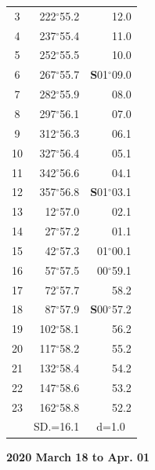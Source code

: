 \documentclass[10pt, a4paper]{report}
\begin{document}
\begin{scriptsize}
\begin{tabular*}{0.2\textwidth}[t]{@{\extracolsep{\fill}}|c|rr|}
3 & 222$^\circ$55.2 & \raisebox{0.24ex}{\boldmath$\cdot$~\boldmath$\cdot$~~}12.0\\
4 & 237$^\circ$55.4 & 11.0\\
5 & 252$^\circ$55.5 & 10.0\\[2Pt]
6 & 267$^\circ$55.7 & \textbf{S}01$^\circ$09.0\\
7 & 282$^\circ$55.9 & 08.0\\
8 & 297$^\circ$56.1 & 07.0\\
9 & 312$^\circ$56.3 & \raisebox{0.24ex}{\boldmath$\cdot$~\boldmath$\cdot$~~}06.1\\
10 & 327$^\circ$56.4 & 05.1\\
11 & 342$^\circ$56.6 & 04.1\\[2Pt]
12 & 357$^\circ$56.8 & \textbf{S}01$^\circ$03.1\\
13 & 12$^\circ$57.0 & 02.1\\
14 & 27$^\circ$57.2 & 01.1\\
15 & 42$^\circ$57.3 & 01$^\circ$00.1\\
16 & 57$^\circ$57.5 & 00$^\circ$59.1\\
17 & 72$^\circ$57.7 & 58.2\\[2Pt]
18 & 87$^\circ$57.9 & \textbf{S}00$^\circ$57.2\\
19 & 102$^\circ$58.1 & 56.2\\
20 & 117$^\circ$58.2 & 55.2\\
21 & 132$^\circ$58.4 & \raisebox{0.24ex}{\boldmath$\cdot$~\boldmath$\cdot$~~}54.2\\
22 & 147$^\circ$58.6 & 53.2\\
23 & 162$^\circ$58.8 & 52.2\\
\hline
\rule{0pt}{2.4ex} & \multicolumn{1}{c}{SD.=16.1} & \multicolumn{1}{c|}{d=1.0}\\
\hline
\end{tabular*}

\end{scriptsize}
\newpage
\sffamily
\noindent
\begin{flushright}
\textbf{2020 March 18 to Apr. 01}\par
\end{flushright}
\end{document}

